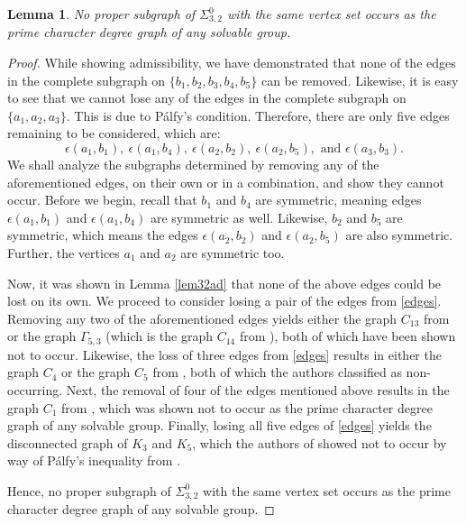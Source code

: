 \documentclass[11pt]{amsart}
\newtheorem{lemma}[theorem]{Lemma}
\theoremstyle{definition}
\theoremstyle{remark}
\numberwithin{equation}{section}
\newcommand{\SZ}[2]{\Sigma_{#1,#2}^0} %
\begin{document}
\begin{lemma}\label{lem32sub}
No proper subgraph of $\SZ{3}{2}$ with the same vertex set occurs as the prime character degree graph of any solvable group.
\end{lemma}
\begin{proof}
While showing admissibility, we have demonstrated that none of the edges in the complete subgraph on $\{b_1,b_2,b_3,b_4,b_5\}$ can be removed. Likewise, it is easy to see that we cannot lose any of the edges in the complete subgraph on $\{a_1,a_2,a_3\}$. This is due to P\'alfy's condition. Therefore, there are only five edges remaining to be considered, which are:
\begin{equation}\label{edges}
\epsilon(a_1,b_1),~\epsilon(a_1,b_4),~\epsilon(a_2,b_2),~\epsilon(a_2,b_5),\text{~and~}\epsilon(a_3,b_3).
\end{equation}
We shall analyze the subgraphs determined by removing any of the aforementioned edges, on their own or in a combination, and show they cannot occur. Before we begin, recall that $b_1$ and $b_4$ are symmetric, meaning edges $\epsilon(a_1,b_1)$ and $\epsilon(a_1,b_4)$ are symmetric as well. Likewise, $b_2$ and $b_5$ are symmetric, which means the edges $\epsilon(a_2,b_2)$ and $\epsilon(a_2,b_5)$ are also symmetric. Further, the vertices $a_1$ and $a_2$ are symmetric too.

Now, it was shown in Lemma \ref{lem32ad} that none of the above edges could be lost on its own. We proceed to consider losing a pair of the edges from \eqref{edges}. Removing any two of the aforementioned edges yields either the graph $C_{13}$ from \cite{LS2} or the graph $\Gamma_{5,3}$ (which is the graph $C_{14}$ from \cite{LS2}), both of which have been shown not to occur. Likewise, the loss of three edges from \eqref{edges} results in either the graph $C_{4}$ or the graph $C_{5}$ from \cite{LS2}, both of which the authors classified as non-occurring. Next, the removal of four of the edges mentioned above results in the graph $C_{1}$ from \cite{LS2}, which was shown not to occur as the prime character degree graph of any solvable group. Finally, losing all five edges of \eqref{edges} yields the disconnected graph of $K_3$ and $K_5$, which the authors of \cite{LS2} showed not to occur by way of P\'alfy's inequality from \cite{P2}.

Hence, no proper subgraph of $\SZ{3}{2}$ with the same vertex set occurs as the prime character degree graph of any solvable group.
\end{proof}
\end{document}

